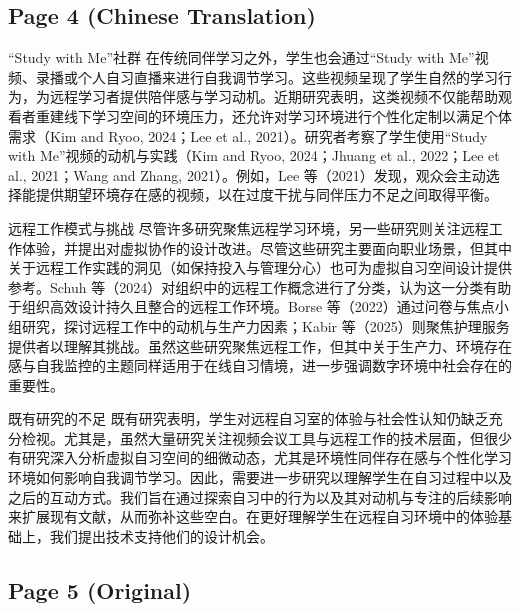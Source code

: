 \documentclass[12pt]{ctexart}
\begin{document}
\subsection*{Page 4 (Chinese Translation)}

“Study with Me”社群
在传统同伴学习之外，学生也会通过“Study with Me”视频、录播或个人自习直播来进行自我调节学习。这些视频呈现了学生自然的学习行为，为远程学习者提供陪伴感与学习动机。近期研究表明，这类视频不仅能帮助观看者重建线下学习空间的环境压力，还允许对学习环境进行个性化定制以满足个体需求（Kim and Ryoo, 2024；Lee et al., 2021）。研究者考察了学生使用“Study with Me”视频的动机与实践（Kim and Ryoo, 2024；Jhuang et al., 2022；Lee et al., 2021；Wang and Zhang, 2021）。例如，Lee 等（2021）发现，观众会主动选择能提供期望环境存在感的视频，以在过度干扰与同伴压力不足之间取得平衡。

远程工作模式与挑战
尽管许多研究聚焦远程学习环境，另一些研究则关注远程工作体验，并提出对虚拟协作的设计改进。尽管这些研究主要面向职业场景，但其中关于远程工作实践的洞见（如保持投入与管理分心）也可为虚拟自习空间设计提供参考。Schuh 等（2024）对组织中的远程工作概念进行了分类，认为这一分类有助于组织高效设计持久且整合的远程工作环境。Borse 等（2022）通过问卷与焦点小组研究，探讨远程工作中的动机与生产力因素；Kabir 等（2025）则聚焦护理服务提供者以理解其挑战。虽然这些研究聚焦远程工作，但其中关于生产力、环境存在感与自我监控的主题同样适用于在线自习情境，进一步强调数字环境中社会存在的重要性。

既有研究的不足
既有研究表明，学生对远程自习室的体验与社会性认知仍缺乏充分检视。尤其是，虽然大量研究关注视频会议工具与远程工作的技术层面，但很少有研究深入分析虚拟自习空间的细微动态，尤其是环境性同伴存在感与个性化学习环境如何影响自我调节学习。因此，需要进一步研究以理解学生在自习过程中以及之后的互动方式。我们旨在通过探索自习中的行为以及其对动机与专注的后续影响来扩展现有文献，从而弥补这些空白。在更好理解学生在远程自习环境中的体验基础上，我们提出技术支持他们的设计机会。


\subsection*{Page 5 (Original)}
\end{document}
